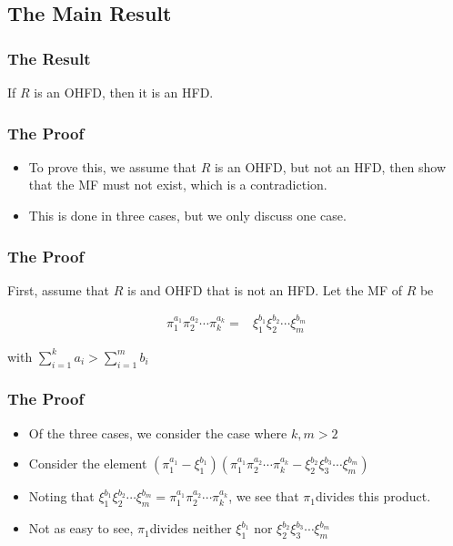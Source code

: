 \subsection{The Main Result}
\begin{frame}

	\frametitle{The Result}
	\begin{theorem}
	If $R$ is an OHFD, then it is an HFD.
	\end{theorem}
\end{frame}

\begin{frame}
  \frametitle{The Proof}
  \begin{itemize}
    \item To prove this, we assume that $R$ is an OHFD, but not an HFD, then show that the MF must not exist, which is a contradiction.
    \item This is done in three cases, but we only discuss one case.
  \end{itemize}
\end{frame}

\begin{frame}
  \frametitle{The Proof}

  First, assume that $R$ is and OHFD that is not an HFD. Let the MF of $R$ be 

  \begin{align*}
    \pi_{1}^{a_{1}}\pi_{2}^{a_{2}}\cdots\pi_{k}^{a_{k}}= & \xi_{1}^{b_{1}}\xi_{2}^{b_{2}}\cdots\xi_{m}^{b_{m}}
  \end{align*}

  with $\sum_{i=1}^{k}a_{i}>\sum_{i=1}^{m}b_{i}$
\end{frame}

\begin{frame}
  \frametitle{The Proof}
  \begin{itemize}
    \item Of the three cases, we consider the case where $k,m>2$
  \end{itemize}

  \pause{}
  \begin{itemize}
    \item Consider the element $(\pi_{1}^{a_{1}}-\xi_{1}^{b_{1}})(\pi_{1}^{a_{1}}\pi_{2}^{a_{2}}\cdots\pi_{k}^{a_{k}}-\xi_{2}^{b_{2}}\xi_{3}^{b_{3}}\cdots\xi_{m}^{b_{m}})$
  \end{itemize}

  \pause{}
  \begin{itemize}
    \item Noting that $\xi_{1}^{b_{1}}\xi_{2}^{b_{2}}\cdots\xi_{m}^{b_{m}}=\pi_{1}^{a_{1}}\pi_{2}^{a_{2}}\cdots\pi_{k}^{a_{k}}$, we see that $\pi_{1}$divides this product. 
  \end{itemize}

  \pause{}
  \begin{itemize}
    \item Not as easy to see, $\pi_{1}$divides neither $\xi_{1}^{b_{1}}$ nor
      $\xi_{2}^{b_{2}}\xi_{3}^{b_{3}}\cdots\xi_{m}^{b_{m}}$
  \end{itemize}
\end{frame}

